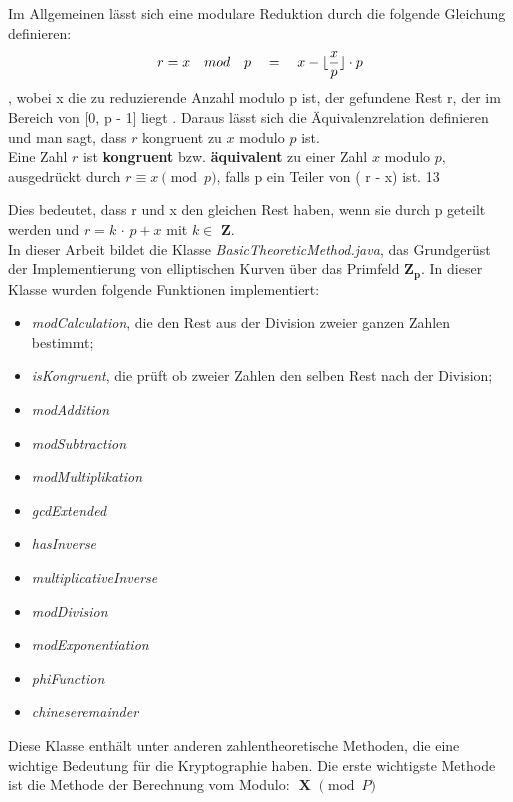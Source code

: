 Im Allgemeinen lässt sich eine modulare Reduktion durch die folgende Gleichung definieren: \[ r = x \quad mod \quad p \quad = \quad x - \lfloor\frac{x}{p}\rfloor \cdot p \], wobei x die zu reduzierende Anzahl modulo p ist, der gefundene Rest r, der im Bereich von [0, p - 1] liegt \cite{patent}. Daraus lässt sich die Äquivalenzrelation definieren und man sagt, dass $ r $ kongruent zu $ x $ modulo $ p $ ist.\\

Eine Zahl $ r $ ist \textbf{kongruent} bzw. \textbf{äquivalent} zu einer Zahl $ x $ modulo $ p $, ausgedrückt durch \( r \equiv x \pmod{p} \), falls p ein Teiler von ( r - x) ist. 
13


Dies bedeutet, dass r und x den gleichen Rest haben, wenn sie durch p geteilt werden und $ r = k $ $\cdot $ $ p + x $ mit  $ k \in $ $ \mathbf{Z} $.\\



In dieser Arbeit bildet  die Klasse \textit{BasicTheoreticMethod.java}, das Grundgerüst der Implementierung von elliptischen Kurven über das Primfeld $\mathbf{ Z_p} $. 
In dieser Klasse wurden folgende Funktionen implementiert:
\begin{itemize}
    \item \textit{modCalculation}, die den Rest aus der Division zweier ganzen Zahlen bestimmt; 
    \item \textit{isKongruent}, die prüft ob zweier Zahlen den selben Rest nach der Division;
    \item \textit{modAddition}
    \item \textit{modSubtraction}
    \item \textit{modMultiplikation}
    \item \textit{gcdExtended}
    \item \textit{hasInverse}
    \item \textit{multiplicativeInverse}
    \item \textit{modDivision}
    \item \textit{modExponentiation}
    \item \textit{phiFunction}
    \item \textit{chineseremainder}
\end{itemize}

Diese Klasse enthält unter anderen zahlentheoretische Methoden, die eine wichtige Bedeutung für die Kryptographie haben.
Die erste wichtigste Methode ist die Methode der Berechnung vom Modulo: $\textbf{ X $\pmod P $} $

